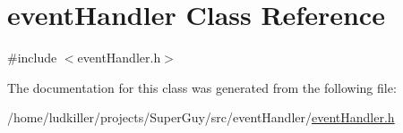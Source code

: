 \hypertarget{classevent_handler}{\section{event\-Handler Class Reference}
\label{classevent_handler}
}


{\ttfamily \#include $<$event\-Handler.\-h$>$}



The documentation for this class was generated from the following file\-:\begin{DoxyCompactItemize}
\item 
/home/ludkiller/projects/\-Super\-Guy/src/event\-Handler/\hyperlink{event_handler_8h}{event\-Handler.\-h}\end{DoxyCompactItemize}
